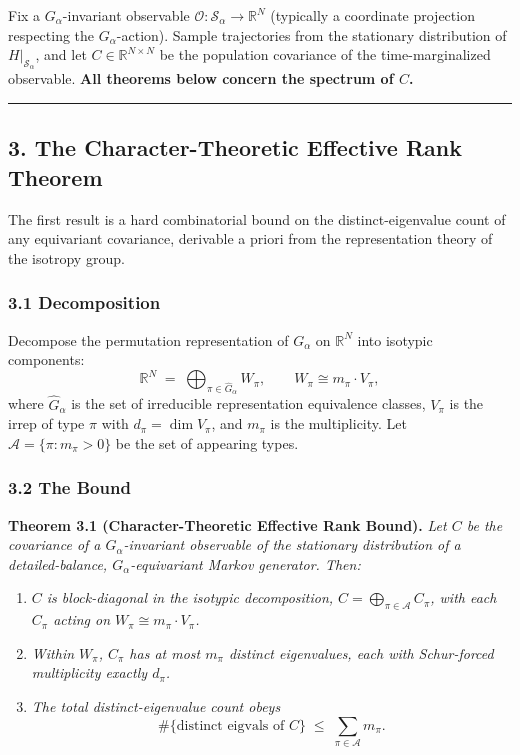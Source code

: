 \documentclass[
  11pt,
]{article}
\providecommand{\tightlist}{%
  \setlength{\itemsep}{0pt}\setlength{\parskip}{0pt}}
\begin{document}
Fix a \(G_\alpha\)-invariant observable
\(\mathcal{O} : \mathcal{S}_\alpha \to \mathbb{R}^N\) (typically a
coordinate projection respecting the \(G_\alpha\)-action). Sample
trajectories from the stationary distribution of
\(H \vert_{\mathcal{S}_\alpha}\), and let
\(C \in \mathbb{R}^{N \times N}\) be the population covariance of the
time-marginalized observable. \textbf{All theorems below concern the
spectrum of \(C\).}

\begin{center}\rule{0.5\linewidth}{0.5pt}\end{center}

\subsection{3. The Character-Theoretic Effective Rank
Theorem}\label{the-character-theoretic-effective-rank-theorem}

The first result is a hard combinatorial bound on the
distinct-eigenvalue count of any equivariant covariance, derivable a
priori from the representation theory of the isotropy group.

\subsubsection{3.1 Decomposition}\label{decomposition}

Decompose the permutation representation of \(G_\alpha\) on
\(\mathbb{R}^N\) into isotypic components:
\[\mathbb{R}^N \;=\; \bigoplus_{\pi \in \widehat{G}_\alpha} W_\pi, \qquad W_\pi \cong m_\pi \cdot V_\pi, \tag{3.1}\]
where \(\widehat{G}_\alpha\) is the set of irreducible representation
equivalence classes, \(V_\pi\) is the irrep of type \(\pi\) with
\(d_\pi = \dim V_\pi\), and \(m_\pi\) is the multiplicity. Let
\(\mathcal{A} = \{\pi : m_\pi > 0\}\) be the set of appearing types.

\subsubsection{3.2 The Bound}\label{the-bound}

\textbf{Theorem 3.1 (Character-Theoretic Effective Rank Bound).}
\emph{Let \(C\) be the covariance of a \(G_\alpha\)-invariant observable
of the stationary distribution of a detailed-balance,
\(G_\alpha\)-equivariant Markov generator. Then:}

\begin{enumerate}
\def\labelenumi{\arabic{enumi}.}
\tightlist
\item
  \emph{\(C\) is block-diagonal in the isotypic decomposition,
  \(C = \bigoplus_{\pi \in \mathcal{A}} C_\pi\), with each \(C_\pi\)
  acting on \(W_\pi \cong m_\pi \cdot V_\pi\).}
\item
  \emph{Within \(W_\pi\), \(C_\pi\) has at most \(m_\pi\) distinct
  eigenvalues, each with Schur-forced multiplicity exactly \(d_\pi\).}
\item
  \emph{The total distinct-eigenvalue count obeys}
  \[\#\{\text{distinct eigvals of } C\} \;\leq\; \sum_{\pi \in \mathcal{A}} m_\pi. \tag{3.2}\]
\end{enumerate}
\end{document}
